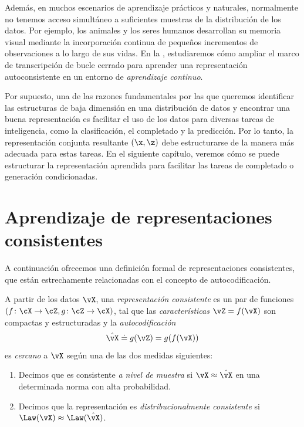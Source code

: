 \documentclass[../../book-main_es.tex]{subfiles}
\begin{document}
Además, en muchos escenarios de aprendizaje prácticos y naturales,
normalmente no tenemos acceso simultáneo a suficientes muestras de la distribución de los datos.
Por ejemplo, los animales y los seres humanos desarrollan su
memoria visual mediante la incorporación continua de pequeños incrementos de observaciones
a lo largo de sus vidas. En la , estudiaremos cómo
ampliar el marco de transcripción de bucle cerrado para aprender una
representación autoconsistente en un entorno de {\em aprendizaje continuo}.

Por supuesto, una de las razones fundamentales por las que queremos identificar las
estructuras de baja dimensión en una distribución de datos y encontrar una buena
representación es facilitar el uso de los datos para diversas tareas
de inteligencia, como la clasificación, el completado y la predicción.
Por lo tanto, la representación conjunta resultante $(\x, \z)$ debe
estructurarse de la manera más adecuada para estas tareas. En el
siguiente capítulo, veremos
cómo se puede estructurar la representación aprendida para facilitar
las tareas de completado o generación condicionadas.

\section{Aprendizaje de representaciones
consistentes}\label{sec:consistent-representation}

A continuación ofrecemos una definición formal de representaciones consistentes, que
están estrechamente relacionadas con el concepto de autocodificación. %
\begin{definition}\label{def:bidirectional_rep}
    A partir de los datos \(\vX\), una \textit{representación consistente} es un par
    de funciones \((f \colon \cX \to \cZ, g \colon \cZ \to \cX)\), tal
    que las \textit{características} \(\vZ = f(\vX)\) son compactas y
    estructuradas y la \textit{autocodificación}
    \begin{equation}
        \hat{\vX} \doteq g(\vZ) = g(f(\vX))
    \end{equation}
    es \textit{cercano} a \(\vX\) según una de las
    dos medidas siguientes:
    \begin{enumerate}
        \item Decimos que es consistente \textit{a nivel de muestra} si \(\vX
            \approx \hat{\vX}\) en una determinada norma con alta probabilidad.
        \item Decimos que la representación es \textit{distribucionalmente
            consistente} si \(\Law(\vX) \approx \Law(\hat{\vX})\).
    \end{enumerate}
\end{definition}
\end{document}
